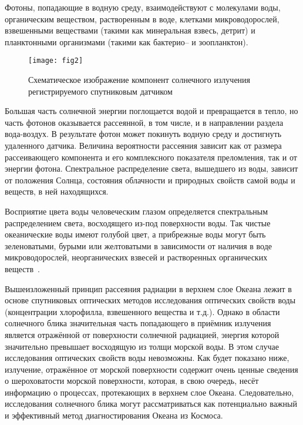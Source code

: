 Фотоны, попадающие в водную среду, взаимодействуют с молекулами воды, органическим веществом, растворенным в воде, клетками микроводорослей, взвешенными веществами (такими как минеральная взвесь, детрит) и планктонными организмами (такими как бактерио-- и зоопланктон).



\begin{figure}[!thb]
 \texttt{[image: fig2]}
 \caption{Схематическое изображение компонент солнечного излучения регистрируемого спутниковым датчиком}
 \label{fig:2} 
\end{figure}

Большая часть солнечной энергии поглощается водой и превращается в тепло, но часть фотонов оказывается рассеянной, в том числе, и в направлении раздела вода-воздух. В результате фотон может покинуть водную среду и достигнуть удаленного датчика. Величина вероятности рассеяния зависит как от размера рассеивающего компонента и его комплексного показателя преломления, так и от энергии фотона. Спектральное распределение света, вышедшего из воды, зависит от положения Солнца, состояния облачности и природных свойств самой воды и веществ, в ней находящихся.

Восприятие цвета воды человеческим глазом определяется спектральным распределением света, восходящего из-под поверхности воды. Так чистые океанические воды имеют голубой цвет, а прибрежные воды могут быть зеленоватыми, бурыми или желтоватыми в зависимости от наличия в воде микроводорослей, неорганических взвесей и растворенных органических веществ~\citep{Pozdnyakov2003}.

Вышеизложенный принцип рассеяния радиации в верхнем слое Океана лежит в основе спутниковых оптических методов исследования оптических свойств воды (концентрации хлорофилла, взвешенного вещества и т.д.). Однако в области солнечного блика значительная часть попадающего в приёмник излучения является отражённой от поверхности солнечной радиацией, энергия которой значительно превышает восходящую из толщи морской воды. В этом случае исследования оптических свойств воды невозможны. Как будет показано ниже, излучение, отражённое от морской поверхности содержит очень ценные сведения о шероховатости морской поверхности, которая, в свою очередь, несёт информацию о процессах, протекающих в верхнем слое Океана. Следовательно, исследования солнечного блика могут рассматриваться как потенциально важный и эффективный метод диагностирования Океана из Космоса.



